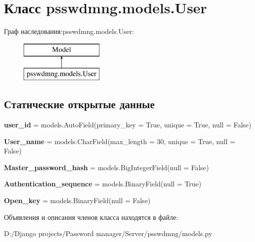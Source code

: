 \section{Класс psswdmng.\+models.\+User}
\label{classpsswdmng_1_1models_1_1_user}
Граф наследования\+:psswdmng.\+models.\+User\+:\begin{figure}[H]
\begin{center}
\leavevmode
\includegraphics[height=2.000000cm]{classpsswdmng_1_1models_1_1_user}
\end{center}
\end{figure}
\subsection*{Статические открытые данные}
\begin{DoxyCompactItemize}
\item 
\mbox{\label{classpsswdmng_1_1models_1_1_user_a342033408a0a29f5724f68e127785cb3}} 
{\bfseries user\+\_\+id} = models.\+Auto\+Field(primary\+\_\+key = True, unique = True, null = False)
\item 
\mbox{\label{classpsswdmng_1_1models_1_1_user_a240a30b902c35aad9e7f6808406d7182}} 
{\bfseries User\+\_\+name} = models.\+Char\+Field(max\+\_\+length = 30, unique = True, null = False)
\item 
\mbox{\label{classpsswdmng_1_1models_1_1_user_a449f8949952806bffd673865a95a052b}} 
{\bfseries Master\+\_\+password\+\_\+hash} = models.\+Big\+Integer\+Field(null = False)
\item 
\mbox{\label{classpsswdmng_1_1models_1_1_user_a14c6456d486be40c27c630face66b933}} 
{\bfseries Authentication\+\_\+sequence} = models.\+Binary\+Field(null = True)
\item 
\mbox{\label{classpsswdmng_1_1models_1_1_user_a9593edac6f90ae86c274f0dbcd509a48}} 
{\bfseries Open\+\_\+key} = models.\+Binary\+Field(null = False)
\end{DoxyCompactItemize}


Объявления и описания членов класса находятся в файле\+:\begin{DoxyCompactItemize}
\item 
D\+:/\+Django projects/\+Password manager/\+Server/psswdmng/models.\+py\end{DoxyCompactItemize}
